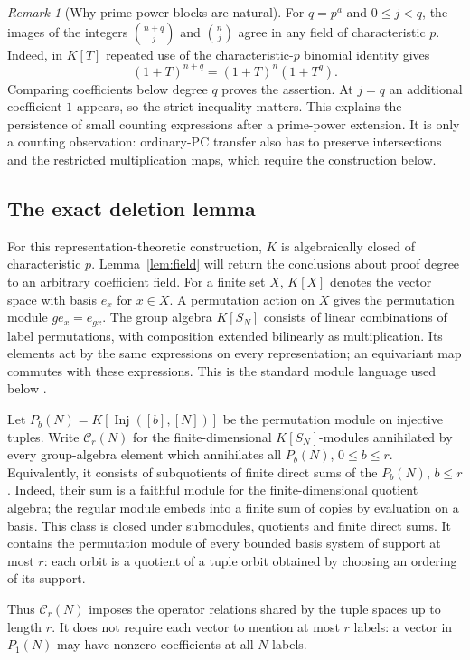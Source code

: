 \documentclass[11pt,a4paper]{article}
\theoremstyle{definition}\newtheorem{definition}[theorem]{Definition}
\theoremstyle{remark}\newtheorem{remark}[theorem]{Remark}
\begin{document}
\begin{remark}[Why prime-power blocks are natural]\label{rem:prime-power-counts}
For $q=p^a$ and $0\le j<q$, the images of the integers
$\binom{n+q}{j}$ and $\binom n j$ agree in any field of characteristic
$p$. Indeed, in $K[T]$ repeated use of the characteristic-$p$ binomial
identity gives
\[
 (1+T)^{n+q}=(1+T)^n(1+T^q).
\]
Comparing coefficients below degree $q$ proves the assertion. At
$j=q$ an additional coefficient $1$ appears, so the strict inequality
matters. This explains the persistence of small counting expressions
after a prime-power extension. It is only a counting observation:
ordinary-PC transfer also has to preserve intersections and the
restricted multiplication maps, which require the construction below.
\end{remark}

\subsection{The exact deletion lemma}
For this representation-theoretic construction, $K$ is algebraically
closed of characteristic $p$. Lemma~\ref{lem:field} will return the
conclusions about proof degree to an arbitrary coefficient field.
For a finite set $X$, $K[X]$ denotes the vector space with basis
$e_x$ for $x\in X$. A permutation action on $X$ gives the permutation
module $g e_x=e_{gx}$. The group algebra $K[S_N]$ consists of linear
combinations of label permutations, with composition extended
bilinearly as multiplication. Its elements act by the same expressions
on every representation; an equivariant map commutes with these
expressions. This is the standard module language used below
\cite{AlperinLocal}.

Let $P_b(N)=K[\operatorname{Inj}([b],[N])]$ be the permutation module on injective tuples. Write $\mathcal C_r(N)$ for the finite-dimensional $K[S_N]$-modules annihilated by every group-algebra element which annihilates all $P_b(N)$, $0\le b\le r$. Equivalently, it consists of subquotients of finite direct sums of the $P_b(N)$, $b\le r$. Indeed, their sum is a faithful module for the finite-dimensional quotient algebra; the regular module embeds into a finite sum of copies by evaluation on a basis. This class is closed under submodules, quotients and finite direct sums. It contains the permutation module of every bounded basis system of support at most $r$: each orbit is a quotient of a tuple orbit obtained by choosing an ordering of its support.

Thus $\mathcal C_r(N)$ imposes the operator relations shared by the
tuple spaces up to length $r$. It does not require each vector to
mention at most $r$ labels: a vector in $P_1(N)$ may have nonzero
coefficients at all $N$ labels.
\end{document}
